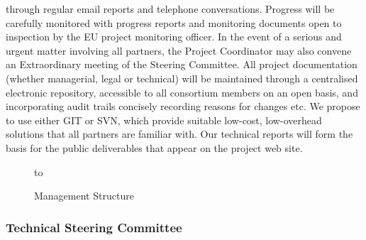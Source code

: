 \documentclass[a4paper,11pt]{article}
\begin{document}
through regular email reports and telephone conversations.
Progress will be carefully monitored with progress reports and
monitoring documents open to inspection by the EU project
monitoring officer. In the event of a serious and urgent matter
involving all partners, the Project Coordinator may also
convene an Extraordinary meeting of the Steering Committee.
%
All project documentation (whether managerial, legal or
technical) will be maintained through a centralised electronic
repository, accessible to all consortium members on an open
basis, and incorporating audit trails concisely recording
reasons for changes etc.  We propose to use either GIT or SVN,
which provide suitable low-cost,  low-overhead solutions that all partners are
familiar with.  Our technical reports will form the basis for
the public deliverables that appear on the project web site.

\begin{figure}[ht!]
\vspace{-0.75in}
\begin{center}
\centerline{\hspace{1in} \hbox to }
\end{center}
\vspace{-1.8in}
\caption{Management Structure}
\label{fig:management}
\end{figure}



\subsubsection*{Technical Steering Committee}
\vspace{-6pt}
\end{document}
